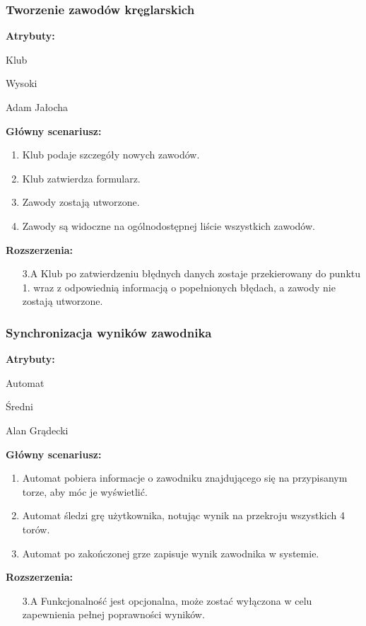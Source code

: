 \documentclass[polish, a4paper]{article}
\begin{document}
\subsubsection{Tworzenie zawodów kręglarskich}
\noindent
\textbf{Atrybuty:}
\begin{description}[labelindent=0.5cm]
    \item[Główny aktor:]{Klub}
    \item[Priorytet:]{Wysoki}
    \item[Źródło:]{Adam Jałocha}
\end{description}

\noindent
\textbf{Główny scenariusz:}
\begin{enumerate}
    \item Klub podaje szczegóły nowych zawodów.
    \item Klub zatwierdza formularz.
    \item Zawody zostają utworzone.
    \item Zawody są widoczne na ogólnodostępnej liście wszystkich zawodów.
\end{enumerate}
\noindent
\textbf{Rozszerzenia:}
\begin{itemize}
    \item[3.A] Klub po zatwierdzeniu błędnych danych zostaje przekierowany do punktu 1. wraz z odpowiednią informacją o popełnionych błędach, a zawody nie zostają utworzone.
\end{itemize}


\subsubsection{Synchronizacja wyników zawodnika}
\noindent
\textbf{Atrybuty:}
\begin{description}[labelindent=0.5cm]
    \item[Główny aktor:]{Automat}
    \item[Priorytet:]{Średni}
    \item[Źródło:]{Alan Grądecki}
\end{description}

\noindent
\textbf{Główny scenariusz:}
\begin{enumerate}
    \item Automat pobiera informacje o zawodniku znajdującego się na przypisanym torze, aby móc je wyświetlić.
    \item Automat śledzi grę użytkownika, notując wynik na przekroju wszystkich 4 torów.
    \item Automat po zakończonej grze zapisuje wynik zawodnika w systemie.
\end{enumerate}
\noindent
\textbf{Rozszerzenia:}
\begin{itemize}
    \item[3.A] Funkcjonalność jest opcjonalna, może zostać wyłączona w celu zapewnienia pełnej poprawności wyników.
\end{itemize}
\end{document}
